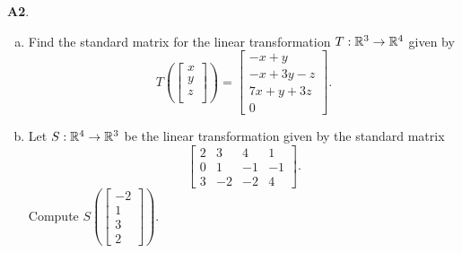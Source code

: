 \documentclass{article}
\newenvironment{problem}[1]
{
  \begin{flushleft}
  \textbf{#1}.
  \ignorespaces
}
{
  \end{flushleft}
}
\begin{document}
\begin{problem}{A2}
\begin{enumerate}[(a)]
\item Find the standard matrix for the linear transformation \(T: \mathbb{R}^3\rightarrow \mathbb{R}^4\) given by \[T\left(\begin{bmatrix} x \\ y \\ z \\  \end{bmatrix} \right) = \begin{bmatrix} -x+y \\ -x+3y-z \\ 7x+y+3z \\ 0 \end{bmatrix}.\]
\item Let \(S: \mathbb{R}^4 \rightarrow \mathbb{R}^3\) be the linear transformation given by the standard matrix \[\begin{bmatrix} 2 & 3 & 4 & 1 \\ 0 & 1 & -1 & -1 \\ 3 & -2 & -2 & 4 \end{bmatrix}.\]
Compute  \( S\left( \begin{bmatrix} -2 \\ 1 \\ 3 \\ 2\end{bmatrix} \right) \).
\end{enumerate}
\end{problem}
\end{document}
